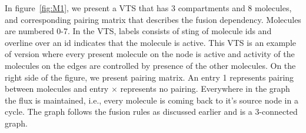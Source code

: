 

\begin{example}
%
In figure~\ref{fig:M1}, we present a VTS that has 3
compartments and 8 molecules, and corresponding pairing matrix that
describes the fusion dependency.
%
Molecules are numbered 0-7.
%
In the VTS, labels consists of sting of molecule ids and overline
over an id indicates that the molecule is active.
%
This VTS is an example of version where every present molecule on
the node is active and activity of the molecules on the
edges are controlled by presence of the other molecules.
%
On the right side of the figure, we present pairing matrix.
%
An entry 1 represents pairing between molecules and
entry $\times$ represents no pairing.
%
Everywhere in the graph the flux is maintained, i.e.,
every molecule is coming back to it's source node in a cycle.
%
The graph follows the fusion rules as discussed earlier and
is a 3-connected graph.
\end{example}


